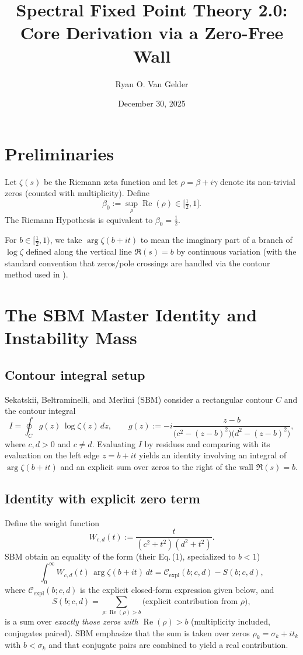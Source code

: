 \documentclass[11pt]{article}
\title{Spectral Fixed Point Theory 2.0: Core Derivation via a Zero-Free Wall}
\author{Ryan O. Van Gelder}
\date{December 30, 2025}
\theoremstyle{definition}
\newcommand{\ReB}{\operatorname{Re}}
\newcommand{\argB}{\operatorname{arg}}
\begin{document}
\maketitle

\section{Preliminaries}
Let $\zeta(s)$ be the Riemann zeta function and let $\rho=\beta+i\gamma$ denote its non-trivial zeros (counted with multiplicity).
Define
\[
\beta_0 := \sup_{\rho}\ReB(\rho)\in \Big[\tfrac12,1\Big].
\]
The Riemann Hypothesis is equivalent to $\beta_0=\tfrac12$.

For $b\in[\tfrac12,1)$, we take $\argB\zeta(b+it)$ to mean the imaginary part of a branch of $\log\zeta$ defined along the vertical line $\Re(s)=b$ by continuous variation (with the standard convention that zeros/pole crossings are handled via the contour method used in \cite{SBM2009}).

\section{The SBM Master Identity and Instability Mass}

\subsection{Contour integral setup}
Sekatskii, Beltraminelli, and Merlini (SBM) \cite{SBM2009} consider a rectangular contour $C$ and the contour integral
\[
I=\oint_C g(z)\,\log\zeta(z)\,dz,
\qquad
g(z):=-i\frac{z-b}{\big(c^2-(z-b)^2\big)\big(d^2-(z-b)^2\big)},
\]
where $c,d>0$ and $c\neq d$. Evaluating $I$ by residues and comparing with its evaluation on the left edge $z=b+it$ yields an identity involving an integral of $\arg\zeta(b+it)$ and an explicit sum over zeros to the right of the wall $\Re(s)=b$.

\subsection{Identity with explicit zero term}
Define the weight function
\[
W_{c,d}(t) := \frac{t}{(c^2+t^2)(d^2+t^2)}.
\]
SBM obtain an equality of the form (their Eq.\,(1), specialized to $b<1$)
\begin{equation}\label{eq:SBM_master}
\int_{0}^{\infty}W_{c,d}(t)\,\argB\zeta(b+it)\,dt
=\mathcal{C}_{\mathrm{expl}}(b;c,d)-S(b;c,d),
\end{equation}
where $\mathcal{C}_{\mathrm{expl}}(b;c,d)$ is the explicit closed-form expression given below, and
\[
S(b;c,d)=\sum_{\rho:\ReB(\rho)>b}\Big(\text{explicit contribution from }\rho\Big),
\]
is a sum over \emph{exactly those zeros with $\ReB(\rho)>b$} (multiplicity included, conjugates paired). SBM emphasize that the sum is taken over zeros $\rho_k=\sigma_k+it_k$ with $b<\sigma_k$ and that conjugate pairs are combined to yield a real contribution. \cite[see Eq.\,(1) and surrounding discussion]{SBM2009}
\end{document}
